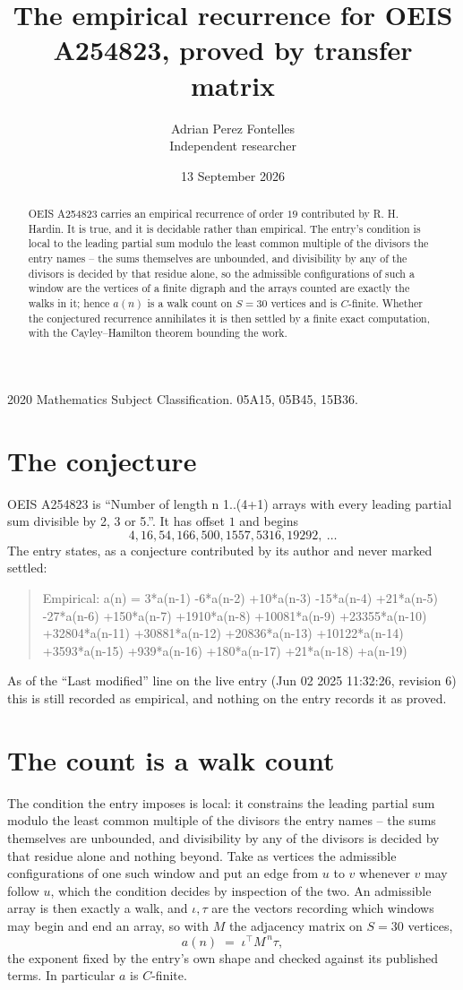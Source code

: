 \documentclass[11pt,a4paper]{article}
\title{The empirical recurrence for OEIS A254823, proved by transfer matrix}
\author{Adrian Perez Fontelles\\ \small Independent researcher}
\date{13 September 2026}
\theoremstyle{plain}
\theoremstyle{definition}
\begin{document}
\maketitle

\begin{abstract}
OEIS A254823 carries an empirical recurrence of order $19$ contributed by R. H. Hardin. It is
true, and it is decidable rather than empirical. The entry's condition is local to the leading partial sum modulo the least common multiple of the divisors the entry names -- the sums themselves are unbounded, and divisibility by any of the divisors is decided by that residue alone, so
the admissible configurations of such a window are the vertices of a finite digraph and the
arrays counted are exactly the walks in it; hence $a(n)$ is a walk count on $S=30$ vertices
and is $C$-finite. Whether the conjectured recurrence annihilates it is then settled by a
finite exact computation, with the Cayley--Hamilton theorem bounding the work.
\end{abstract}

\noindent\small 2020 Mathematics Subject Classification. 05A15, 05B45, 15B36.\normalsize

\section{The conjecture}

OEIS A254823 is ``Number of length n 1..(4+1) arrays with every leading partial sum divisible by 2, 3 or 5.''. It has offset $1$ and begins
\[
4, 16, 54, 166, 500, 1557, 5316, 19292,\ \dots
\]
The entry states, as a conjecture contributed by its author and never marked settled:
\begin{quote}
Empirical: a(n) = 3*a(n-1) -6*a(n-2) +10*a(n-3) -15*a(n-4) +21*a(n-5) -27*a(n-6) +150*a(n-7) +1910*a(n-8) +10081*a(n-9) +23355*a(n-10) +32804*a(n-11) +30881*a(n-12) +20836*a(n-13) +10122*a(n-14) +3593*a(n-15) +939*a(n-16) +180*a(n-17) +21*a(n-18) +a(n-19)
\end{quote}
As of the ``Last modified'' line on the live entry (Jun 02 2025 11:32:26, revision 6) this is still
recorded as empirical, and nothing on the entry records it as proved.

\section{The count is a walk count}

The condition the entry imposes is local: it constrains the leading partial sum modulo the least common multiple of the divisors the entry names -- the sums themselves are unbounded, and divisibility by any of the divisors is decided by that residue alone and nothing beyond. Take as vertices the admissible configurations of one such window and put an edge from $u$ to $v$ whenever $v$ may follow $u$, which the condition decides by inspection of the two.
An admissible array is then exactly a walk, and $\iota,\tau$ are the vectors recording which windows may begin and end an array, so with $M$ the adjacency matrix on $S=30$ vertices,
\[
a(n)\;=\;\iota^{\!\top}M^{\,n}\tau ,
\]
the exponent fixed by the entry's own shape and checked against its published terms. In
particular $a$ is $C$-finite.
\end{document}
